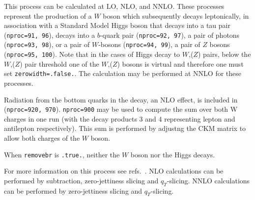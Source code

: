 \label{subsec:wh}

This process can be calculated at LO, NLO, and NNLO.
These processes represent the production of a $W$ boson which subsequently
decays leptonically, in association with a Standard Model Higgs boson that
decays into a tau pair ({\tt nproc=91, 96}),
decays into a $b$-quark pair ({\tt nproc=92, 97}),
a pair of photons ({\tt nproc=93, 98}),
or a pair of $W$-bosons ({\tt nproc=94, 99}),
a pair of $Z$ bosons ({\tt nproc=95, 100}).
Note that in the cases of Higgs decay to $W$,($Z$) pairs,
below the $W$,($Z$) pair threshold
one of the $W$,($Z$) bosons is virtual
and therefore one must set {\tt zerowidth=.false.}.
The calculation may be performed at NNLO for these processes.

Radiation from the bottom quarks in the decay, an NLO effect, is included in  ({\tt nproc=920, 970}).
\texttt{nproc=900} may be used to compute the sum over both W charges in
one run (with the decay products 3 and 4 representing lepton and antilepton
respectively). This sum is performed by adjustng the CKM matrix to allow both charges of the $W$ boson.

When {\tt removebr} is {\tt .true.}, neither the $W$ boson nor the Higgs decays.

For more information on this
process see refs.~\cite{Campbell:2016jau,Boughezal:2016wmq,Campbell:2022gdq}.
NLO calculations can be performed by subtraction, zero-jettiness
slicing and $q_T$-slicing.  NNLO calculations can be performed by
zero-jettiness slicing and $q_T$-slicing.  
